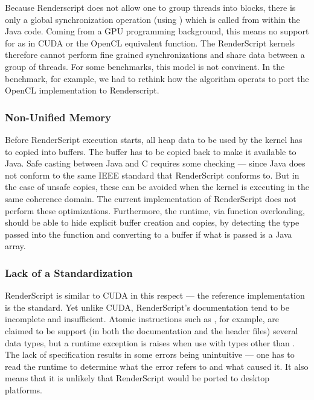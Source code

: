 Because Renderscript does not allow one to group threads into blocks, there is only a global synchronization operation
 (using )  which is called from within the Java code.
Coming from a GPU programming background, this means no support for  as in CUDA or the OpenCL
equivalent  function.
The RenderScript kernels therefore cannot perform fine grained synchronizations and share data between a group of threads.
For some benchmarks, this model is not convinent.
In the  benchmark, for example, we had to rethink how the algorithm operats to port 
  the OpenCL implementation to Renderscript.


\subsubsection{Non-Unified Memory}

Before RenderScript execution starts, all
heap data to be used by the kernel has to copied into  buffers.
The buffer has to be copied back to make it available to Java.
Safe casting between Java and C requires some checking --- since Java does not 
  conform to the same IEEE standard that RenderScript conforms to.
But in the case of unsafe copies, these can be avoided when the kernel is
  executing in the same coherence domain.
The current implementation of RenderScript does not perform these optimizations.
Furthermore, the runtime, via function overloading, should be able to hide 
  explicit buffer creation and copies, by detecting the type passed into the function
  and converting to a  buffer if what is passed is a Java array.

\subsubsection{Lack of a Standardization}

RenderScript is similar to CUDA in this respect --- the reference implementation
  is the standard.
Yet unlike CUDA, RenderScript's documentation tend to be incomplete and insufficient.
Atomic instructions such as , for example, are claimed to be support 
(in both the documentation and the header files) several data types, but a 
runtime exception is raises when use with types other than .
The lack of specification results in some errors being unintuitive --- one has to 
  read the runtime to determine what the error refers to and what caused it.
It also means that it is unlikely that RenderScript would be 
  ported to desktop platforms.


